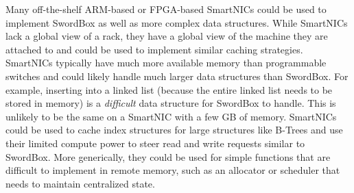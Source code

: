 \documentclass[12pt]{ucsddissertation}
\newcommand{\sword}{SwordBox}
\begin{document}
Many off-the-shelf ARM-based or FPGA-based SmartNICs could be used to implement {\sword} as well as
more complex data structures. While SmartNICs lack a global view of a rack, they have a global view
of the machine they are attached to and could be used to implement similar caching strategies.
SmartNICs typically have much more available memory than programmable switches and could likely
handle much larger data structures than {\sword}. For example, inserting into a linked list (because
the entire linked list needs to be stored in memory) is a \textit{difficult} data structure for
{\sword} to handle. This is unlikely to be the same on a SmartNIC with a few GB of memory. SmartNICs
could be used to cache index structures for large structures like B-Trees and use their limited
compute power to steer read and write requests similar to {\sword}. More generically, they could be
used for simple functions that are difficult to implement in remote memory, such as an allocator or
scheduler that needs to maintain centralized state.


\end{document}
